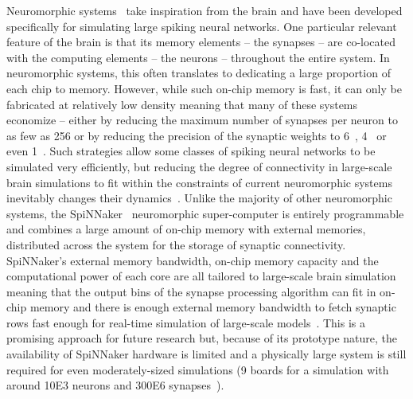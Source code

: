 \documentclass[9pt,twocolumn,twoside,lineno]{pnas-new}
\begin{document}
Neuromorphic systems~\citep{Frenkel2018,Frenkel2019,Furber2014,Merolla2014,Qiao2015,Schemmel2017} take inspiration from the brain and have been developed specifically for simulating large spiking neural networks.
One particular relevant feature of the brain is that its memory elements -- the synapses -- are co-located with the computing elements -- the neurons -- throughout the entire system.
In neuromorphic systems, this often translates to dedicating a large proportion of each chip to memory.
However, while such on-chip memory is fast, it can only be fabricated at relatively low density meaning that many of these systems economize -- either by reducing the maximum number of synapses per neuron to as few as \num{256} or by reducing the precision of the synaptic weights to \num{6}~\citep{Schemmel2017}, \num{4}~\citep{Frenkel2018} or even \SI{1}{\bit}~\citep{Merolla2014,Frenkel2019}.
Such strategies allow some classes of spiking neural networks to be simulated very efficiently, but reducing the degree of connectivity in large-scale brain simulations to fit within the constraints of current neuromorphic systems inevitably changes their dynamics~\citep{VanAlbada2015}.
Unlike the majority of other neuromorphic systems, the SpiNNaker~\citep{Furber2014} neuromorphic super-computer is entirely programmable and combines a large amount of on-chip memory with external memories, distributed across the system for the storage of synaptic connectivity.
SpiNNaker's external memory bandwidth, on-chip memory capacity and the computational power of each core are all tailored to large-scale brain simulation meaning that the output bins of the synapse processing algorithm can fit in on-chip memory and there is enough external memory bandwidth to fetch synaptic rows fast enough for real-time simulation of large-scale models~\citep{Rhodes2019}.
This is a promising approach for future research but, because of its prototype nature, the availability of SpiNNaker hardware is limited and a physically large system is still required for even moderately-sized simulations (9 boards for a simulation with around \num{10E3} neurons and \num{300E6} synapses~\citep{Rhodes2019}).
\end{document}

